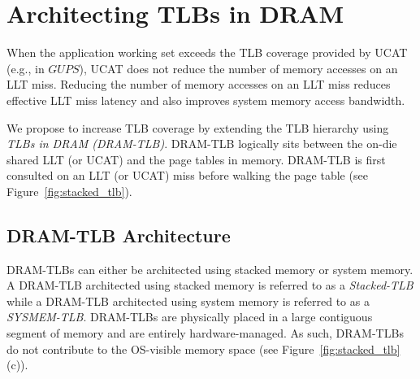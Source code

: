 \section{Architecting TLBs in DRAM } 
\label{sec:stackedTLB}

\noindent When the application working set exceeds the TLB coverage
provided by UCAT (e.g., in $GUPS$), UCAT does not reduce the number of
memory accesses on an LLT miss. Reducing the number of memory accesses
on an LLT miss reduces effective LLT miss latency and also improves 
system memory access bandwidth.

We propose to increase TLB coverage by extending the TLB hierarchy
using {\em TLBs in DRAM (DRAM-TLB)}. DRAM-TLB logically sits between
the on-die shared LLT (or UCAT) and the page tables in memory.
DRAM-TLB is first consulted on an LLT (or UCAT) miss before walking
the page table (see Figure~\ref{fig:stacked_tlb}).


\begin{figure*}[t] 
  \vspace{-0. in} \centering
   \centerline{}

  \caption{\small Improving TLB coverage by embedding TLBs in DRAM
    (DRAM-TLB). A DRAM-TLB architected using commodity DRAM is called
    SYSMEM-TLB and a DRAM-TLB architected with stacked DRAM is called
    Stacked-TLB. \normalsize}
  \label{fig:stacked_tlb} 
  \vspace{-0.1 in}
\end{figure*}

\subsection{DRAM-TLB Architecture}

\noindent DRAM-TLBs can either be architected using stacked memory or
system memory. A DRAM-TLB architected using stacked memory is referred
to as a {\em Stacked-TLB} while a DRAM-TLB architected using system
memory is referred to as a {\em SYSMEM-TLB}. DRAM-TLBs are physically
placed in a large contiguous segment of memory and are entirely
hardware-managed. As such, DRAM-TLBs do not contribute to the
OS-visible memory space (see Figure~\ref{fig:stacked_tlb}(c)).

